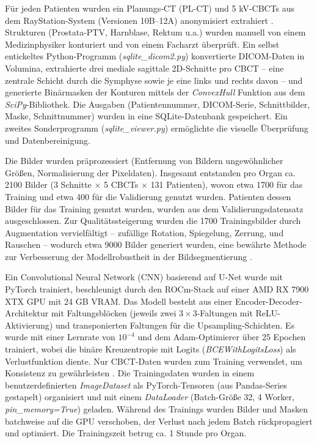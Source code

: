 \documentclass{article}
\begin{document}
Für jeden Patienten wurden ein Planungs-CT (PL-CT) und 5 kV-CBCTs aus dem
RayStation-System (Versionen 10B–12A) anonymisiert extrahiert \citep{zwart2022}.
Strukturen (Prostata-PTV, Harnblase, Rektum u.a.) wurden manuell von einem
Medizinphysiker konturiert und von einem Facharzt überprüft. Ein selbst
entickeltes Python-Programm (\textit{sqlite\_dicom2.py}) \cite{rhone_repo} konvertierte
DICOM-Daten in Volumina, extrahierte drei mediale sagittale 2D-Schnitte pro CBCT
– eine zentrale Schicht durch die Symphyse sowie je eine links und rechts davon
– und generierte Binärmasken der Konturen mittels der \textit{ConvexHull}
Funktion aus dem \textit{SciPy}-Bibliothek. Die Ausgaben (Patientennummer,
DICOM-Serie, Schnittbilder, Maske, Schnittnummer) wurden in eine
SQLite-Datenbank gespeichert. Ein zweites Sonderprogramm
(\textit{sqlite\_viewer.py}) \cite{rhone_repo} ermöglichte die visuelle
Überprüfung und Datenbereinigung.

Die Bilder wurden präprozessiert (Entfernung von Bildern ungewöhnlicher Größen,
Normalisierung der Pixeldaten). Insgesamt entstanden pro Organ ca. 2100 Bilder
(3 Schnitte × 5 CBCTs × 131 Patienten), wovon etwa 1700 für das Training und
etwa 400 für die Validierung genutzt wurden.  Patienten dessen Bilder für das
Training genutzt wurden, wurden aus dem Validierungsdatensatz ausgeschlossen.
Zur Qualitätssteigerung wurden die 1700 Trainingsbilder durch Augmentation
vervielfältigt – zufällige Rotation, Spiegelung, Zerrung, und Rauschen –
wodurch etwa 9000 Bilder generiert wurden, eine bewährte Methode zur
Verbesserung der Modellrobustheit in der Bildsegmentierung
\citep{ronneberger2015, pereira2016, shorten2019}.

Ein Convolutional Neural Network (CNN) basierend auf U-Net
\citep{ronneberger2015} wurde mit PyTorch trainiert, beschleunigt durch den
ROCm-Stack auf einer AMD RX 7900 XTX GPU mit 24 GB VRAM. Das Modell besteht aus
einer Encoder-Decoder-Architektur mit Faltungsblöcken (jeweils zwei \(3 \times
3\)-Faltungen mit ReLU-Aktivierung) und transponierten Faltungen für die
Upsampling-Schichten. Es wurde mit einer Lernrate von \(10^{-4}\) und dem
Adam-Optimierer über 25 Epochen trainiert, wobei die binäre Kreuzentropie mit
Logits (\textit{BCEWithLogitsLoss}) als Verlustfunktion diente. Nur CBCT-Daten
wurden zum Training verwendet, um Konsistenz zu gewährleisten
\citep{litjens2017}. Die Trainingsdaten wurden in einem benutzerdefinierten
\textit{ImageDataset} als PyTorch-Tensoren (aus Pandas-Series gestapelt)
organisiert und mit einem \textit{DataLoader} (Batch-Größe 32, 4 Worker,
\textit{pin\_memory=True}) geladen. Während des Trainings wurden Bilder und
Masken batchweise auf die GPU verschoben, der Verlust nach jedem Batch
rückpropagiert und optimiert. Die Trainingszeit betrug ca. 1 Stunde pro Organ.
\end{document}
